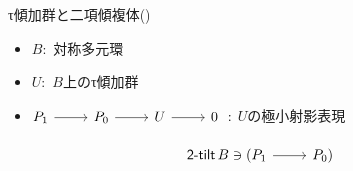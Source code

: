 \documentclass[dvipdfmx,10pt,handout
]{beamer}
\newcommand{\twotilt}{\operatorname{\mathsf{2-tilt}}}
\begin{document}
\begin{frame}
\begin{block}{τ傾加群と二項傾複体(\cite*{MR3187626})}
        \begin{itemize}
            \item \(B:\) 対称多元環
            \item \(U:\) \(B\)上のτ傾加群
            \item \(\begin{tikzcd}[ampersand replacement=\&]
                      \hspace{-4pt}%
                      P_1\ar[r] \& P_0\ar[r]\&U\ar[r]\&0
                  \end{tikzcd}:\) \(U\)の極小射影表現
        \end{itemize}
        \[
            \begin{tikzcd}[ampersand replacement=\&]
                \twotilt B \ni (P_1\ar[r] \& P_0)
            \end{tikzcd}\]
    \end{block}

\end{frame}
\end{document}
